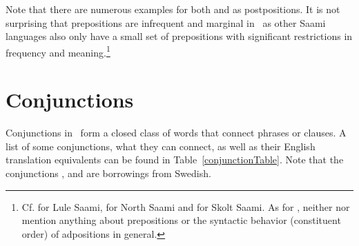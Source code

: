 Note that there are numerous examples for both  and  as postpositions. 
It is not surprising that prepositions are infrequent and marginal in \PS\ as other Saami languages also only have a small set of prepositions with significant restrictions in frequency and meaning.\footnote{Cf. \citet[91-92]{Spiik1989} for Lule Saami, \citet[84-85]{Svonni2009} for North Saami and \citet[314-317]{Feist2010} for Skolt Saami. As for \PS, neither \citet{Lagercrantz1926} nor \citet{Lehtiranta1992} mention anything about prepositions or the syntactic behavior (constituent order) of adpositions in general.} %



\section{Conjunctions}\label{conjunctions}
Conjunctions in \PS\ form a closed class of words that connect phrases or clauses. A list of some conjunctions, what they can connect, as well as their English translation equivalents can be found in Table~\vref{conjunctionTable}. Note that the conjunctions ,  and  are borrowings from Swedish. 
